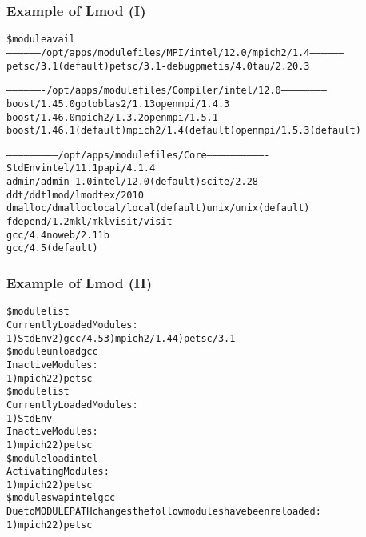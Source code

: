 \documentclass{beamer}
\begin{document}
\begin{frame}[fragile]
    \frametitle{Example of Lmod (I)}
    {\tiny
\begin{alltt}
\$ {\color{blue} module avail}
------------------ /opt/apps/modulefiles/MPI/intel/12.0/mpich2/1.4 ------------------
  petsc/3.1 (default)    petsc/3.1-debug    pmetis/4.0    tau/2.20.3

------------------- /opt/apps/modulefiles/Compiler/intel/12.0 -----------------------
  boost/1.45.0              gotoblas2/1.13          openmpi/1.4.3
  boost/1.46.0              mpich2/1.3.2            openmpi/1.5.1
  boost/1.46.1 (default)    mpich2/1.4 (default)    openmpi/1.5.3 (default)

-------------------------- /opt/apps/modulefiles/Core -------------------------------
  StdEnv               intel/11.1               papi/4.1.4
  admin/admin-1.0      intel/12.0 (default)     scite/2.28
  ddt/ddt              lmod/lmod                tex/2010
  dmalloc/dmalloc      local/local (default)    unix/unix (default)
  fdepend/1.2          mkl/mkl                  visit/visit
  gcc/4.4              noweb/2.11b
  gcc/4.5 (default)
\end{alltt}
    }
\end{frame}

\begin{frame}[fragile]
    \frametitle{Example of Lmod (II)}
    {\tiny
\begin{alltt}
{\color{blue}\$ module list}
    Currently Loaded Modules:
      1) StdEnv  2) gcc/4.5  3) mpich2/1.4  4) petsc/3.1
{\color{blue}\$ module unload gcc}
    Inactive Modules:
      1) mpich2  2) petsc
{\color{blue}\$ module list}
    Currently Loaded Modules:
      1) StdEnv
    Inactive Modules:
      1) mpich2  2) petsc
{\color{blue}\$ module load intel}
    Activating Modules:
      1) mpich2  2) petsc
{\color{blue}\$ module swap intel gcc}
    Due to MODULEPATH changes the follow modules have been reloaded:
      1) mpich2  2) petsc
\end{alltt}
    }
\end{frame}
\end{document}
